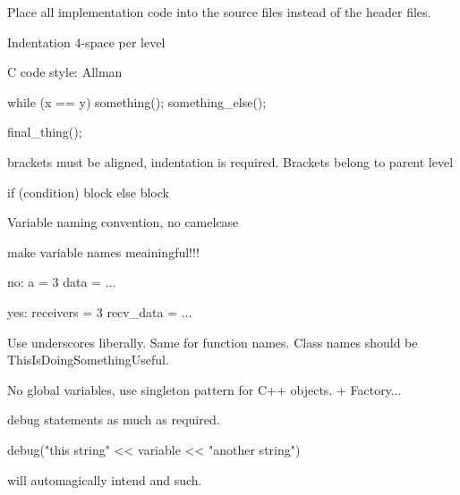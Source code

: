 \documentclass{article}
\begin{document}
Place all implementation code into the source files instead of the header files.

Indentation 4-space per level

C code style: Allman

while (x == y)
{
    something();
    something\_else();
}

final\_thing();

brackets must be aligned, indentation is required. Brackets belong to parent level

if (condition)
{
	block
}
else
{
	block
}

Variable naming convention, no camelcase

make variable names meainingful!!!

no: 
a = 3
data = ...

yes:
receivers = 3
recv\_data = ...

Use underscores liberally. Same for function names. Class names should be ThisIsDoingSomethingUseful.

No global variables, use singleton pattern for C++ objects. + Factory...

debug statements as much as required.

debug("this string" << variable << "another string")

will automagically intend and such.
\end{document}
